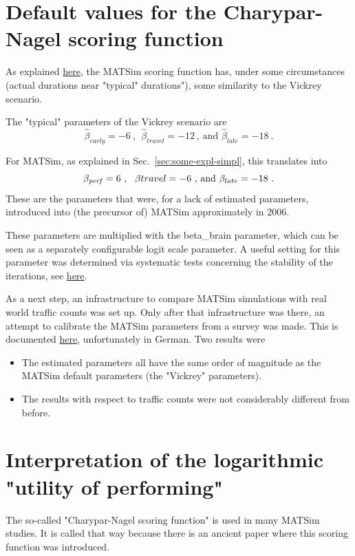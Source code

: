 \section{Default values for the Charypar-Nagel scoring function}

As explained \href{http://matsim.org/node/650}{here},  the MATSim scoring function has, under some circumstances (actual  durations near "typical" durations"), some similarity to the Vickrey  scenario.

The "typical" parameters of the Vickrey scenario are 
\[
\hat\beta_{early}=-6~,~~\hat\beta_{travel}=-12~\mbox{, and } \hat\beta_{late}=-18 \ .
\]

For MATSim, as explained in Sec.~\ref{sec:some-expl-simpl}, this translates into
\[
\beta_{\it perf}=6~,~~\beta{travel}=-6\mbox{ , and } \beta_{late}=-18 \ . 
\]
These are the parameters that were, for a lack of  estimated parameters, introduced into (the precursor of) MATSim  approximately in 2006.

These parameters are multiplied with the beta\_brain parameter, which  can be seen as a separately configurable logit scale parameter. A  useful setting for this parameter was determined via systematic tests  concerning the stability of the iterations, see \href{https://svn.vsp.tu-berlin.de/repos/public-svn/publications/vspwp/2004/04-03/}{here}.

As a next step, an infrastructure to compare MATSim simulations with  real world traffic counts was set up. Only after that  infrastructure was there, an attempt to calibrate the MATSim parameters  from a survey was made. This is documented \href{https://svn.vsp.tu-berlin.de/repos/public-svn/publications/vspwp/2009/09-10/}{here}, unfortunately in German. Two results were
\begin{itemize}
	\item The estimated parameters all have the same order of magnitude as the MATSim default parameters (the "Vickrey" parameters).
	\item The results with respect to traffic counts were not considerably different from before.
\end{itemize}



\section{Interpretation of the logarithmic "utility of performing"}

The  so-called "Charypar-Nagel scoring function" is used in many  MATSim  studies. It is called that way because there is an ancient paper   where this scoring function was introduced.

